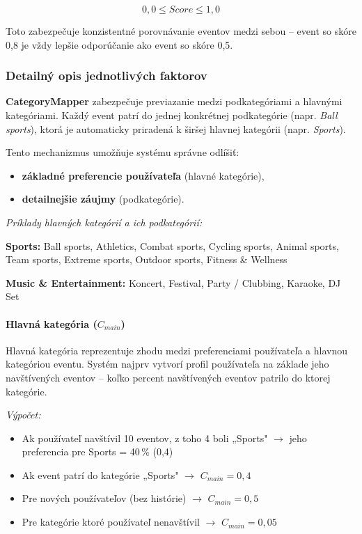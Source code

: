 \begin{equation}
0{,}0 \leq Score \leq 1{,}0
\end{equation}

Toto zabezpečuje konzistentné porovnávanie eventov medzi sebou -- event so skóre 0,8 je vždy lepšie odporúčanie ako event so skóre 0,5.

\subsubsection{Detailný opis jednotlivých faktorov}

\textbf{CategoryMapper} zabezpečuje previazanie medzi podkategóriami a hlavnými kategóriami.
Každý event patrí do jednej konkrétnej podkategórie (napr. \textit{Ball sports}), ktorá je
automaticky priradená k širšej hlavnej kategórii (napr. \textit{Sports}).

Tento mechanizmus umožňuje systému správne odlíšiť:
\begin{itemize}
    \item \textbf{základné preferencie používateľa} (hlavné kategórie),
    \item \textbf{detailnejšie záujmy} (podkategórie).
\end{itemize}

\textit{Príklady hlavných kategórií a ich podkategórií:}

\textbf{Sports:} Ball sports, Athletics, Combat sports, Cycling sports, Animal sports,
Team sports, Extreme sports, Outdoor sports, Fitness \& Wellness

\textbf{Music \& Entertainment:} Koncert, Festival, Party / Clubbing, Karaoke, DJ Set

\paragraph{Hlavná kategória ($C_{main}$)}

Hlavná kategória reprezentuje zhodu medzi preferenciami používateľa a hlavnou kategóriou eventu. Systém najprv vytvorí profil používateľa na základe jeho navštívených eventov -- koľko percent navštívených eventov patrilo do ktorej kategórie.

\textit{Výpočet:}
\begin{itemize}
    \item Ak používateľ navštívil 10 eventov, z toho 4 boli „Sports" $\rightarrow$ jeho preferencia pre Sports = 40\,\% (0,4)
    \item Ak event patrí do kategórie „Sports" $\rightarrow$ $C_{main} = 0{,}4$
    \item Pre nových používateľov (bez histórie) $\rightarrow$ $C_{main} = 0{,}5$
    \item Pre kategórie ktoré používateľ nenavštívil $\rightarrow$ $C_{main} = 0{,}05$
\end{itemize}

